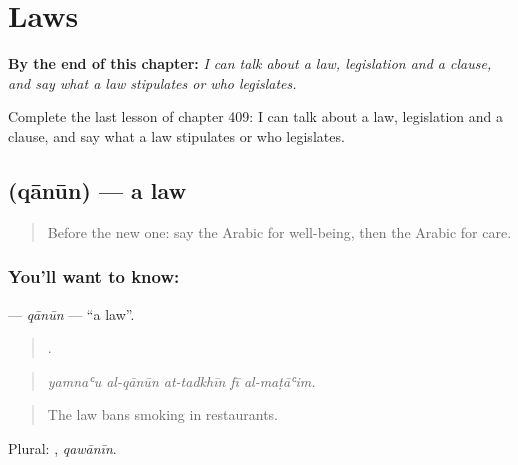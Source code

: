 
\chapter{Laws}
\label{ch:ar-laws}

\begin{chapteropening}
\textbf{By the end of this chapter:} \emph{I can talk about a law, legislation and a clause, and say what a law stipulates or who legislates.}

Complete the last lesson of chapter 409: I can talk about a law, legislation and a clause, and say what a law stipulates or who legislates.
\end{chapteropening}

\section[\texorpdfstring{\ar{قانون} (qānūn)}{قانون (qānūn)}]{ (qānūn) — a law}

\label{lesson:AR-C409-qanun}



\begin{quote}
Before the new one: say the Arabic for well-being, then the Arabic for care.
\end{quote}

\subsection*{You'll want to know: }
\textbf{} — \emph{qānūn} — \textquotedblleft{}a law\textquotedblright{}.

\begin{quote}
    .
\end{quote}

\begin{quote}
\emph{yamnaʿu al-qānūn at-tadkhīn fī al-maṭāʿim.}
\end{quote}

\begin{quote}
The law bans smoking in restaurants.
\end{quote}

Plural: , \emph{qawānīn}.

